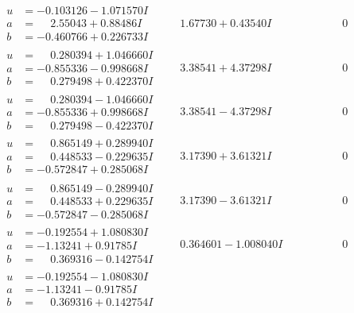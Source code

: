 \documentclass[1p]{elsarticle_modified}
\theoremstyle{definition}
\begin{document}
$$\begin{array}{c|c|c}
\begin{aligned}
u &= -0.103126 - 1.071570 I \\
a &= \phantom{-}2.55043 + 0.88486 I \\
b &= -0.460766 + 0.226733 I\end{aligned}
 & \phantom{-}1.67730 + 0.43540 I & \phantom{-0.000000 } 0 \\ \hline\begin{aligned}
u &= \phantom{-}0.280394 + 1.046660 I \\
a &= -0.855336 - 0.998668 I \\
b &= \phantom{-}0.279498 + 0.422370 I\end{aligned}
 & \phantom{-}3.38541 + 4.37298 I & \phantom{-0.000000 } 0 \\ \hline\begin{aligned}
u &= \phantom{-}0.280394 - 1.046660 I \\
a &= -0.855336 + 0.998668 I \\
b &= \phantom{-}0.279498 - 0.422370 I\end{aligned}
 & \phantom{-}3.38541 - 4.37298 I & \phantom{-0.000000 } 0 \\ \hline\begin{aligned}
u &= \phantom{-}0.865149 + 0.289940 I \\
a &= \phantom{-}0.448533 - 0.229635 I \\
b &= -0.572847 + 0.285068 I\end{aligned}
 & \phantom{-}3.17390 + 3.61321 I & \phantom{-0.000000 } 0 \\ \hline\begin{aligned}
u &= \phantom{-}0.865149 - 0.289940 I \\
a &= \phantom{-}0.448533 + 0.229635 I \\
b &= -0.572847 - 0.285068 I\end{aligned}
 & \phantom{-}3.17390 - 3.61321 I & \phantom{-0.000000 } 0 \\ \hline\begin{aligned}
u &= -0.192554 + 1.080830 I \\
a &= -1.13241 + 0.91785 I \\
b &= \phantom{-}0.369316 - 0.142754 I\end{aligned}
 & \phantom{-}0.364601 - 1.008040 I & \phantom{-0.000000 } 0 \\ \hline\begin{aligned}
u &= -0.192554 - 1.080830 I \\
a &= -1.13241 - 0.91785 I \\
b &= \phantom{-}0.369316 + 0.142754 I\end{aligned}

\end{array}$$
\end{document}

